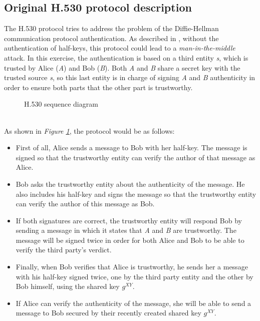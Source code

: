 \subsection{Original H.530 protocol description}\label{subsec:h5301}
The H.530 protocol tries to address the problem of the Diffie-Hellman communication protocol authentication. As described in \cite[p. 19]{sebmod2018}, without the authentication of half-keys, this protocol could lead to a \textit{man-in-the-middle} attack.
In this exercise, the authentication is based on a third entity \textit{s}, which is trusted by Alice (\textit{A}) and Bob (\textit{B}). Both \textit{A} and \textit{B} share a secret key with the trusted source \textit{s}, so this last entity is in charge of signing \textit{A} and \textit{B} authenticity in order to ensure both parts that the other part is trustworthy.
\begin{figure}[hb]
	\centering	
	
	\caption{H.530 sequence diagram}
	\label{fig:h530trace}
\end{figure}
\\
As shown in \textit{Figure \ref{fig:h530trace}}, the protocol would be as follows:
\begin{itemize}
	\item First of all, Alice sends a message to Bob with her half-key. The message is signed so that the trustworthy entity can verify the author of that message as Alice.
	\item Bob asks the trustworthy entity about the authenticity of the message. He also includes his half-key and signs the message so that the trustworthy entity can verify the author of this message as Bob.
	\item If both signatures are correct, the trustworthy entity will respond Bob by sending a message in which it states that \textit{A} and \textit{B} are trustworthy. The message will be signed twice in order for both Alice and Bob to be able to verify the third party's verdict. 
	\item Finally, when Bob verifies that Alice is trustworthy, he sends her a message with his half-key signed twice, one by the third party entity and the other by Bob himself, using the shared key $g^{XY}$.
	\item If Alice can verify the authenticity of the message, she will be able to send a message to Bob secured by their recently created shared key $g^{XY}$.
\end{itemize}
